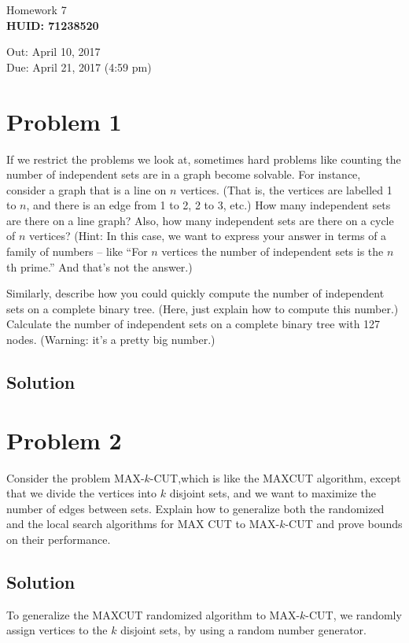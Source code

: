 \documentclass[11pt]{article}
\begin{document}
\begin{center} Homework 7 \\
\textbf{HUID: 71238520}
\end{center}
\begin{flushright}
Out: April 10, 2017\\
Due: April 21, 2017 (4:59 pm)
\end{flushright}

\section{Problem 1}
If we restrict the problems we look at, sometimes hard problems like counting the number of independent sets are in a graph become solvable. For instance, consider a graph that is a line on $n$ vertices. (That is, the vertices are labelled 1 to $n$, and there is an edge from 1 to 2, 2 to 3, etc.) How many independent sets are there on a line graph? Also, how many independent sets are there on a cycle of $n$ vertices? (Hint: In this case, we want to express your answer in terms of a family of numbers – like “For $n$ vertices the number of independent sets is the $n$th prime.” And that’s not the answer.)

Similarly, describe how you could quickly compute the number of independent sets on a complete binary tree. (Here, just explain how to compute this number.) Calculate the number of independent sets on a complete binary tree with 127 nodes. (Warning: it’s a pretty big number.)
\subsection{Solution}

\section{Problem 2}
Consider the problem MAX-$k$-CUT,which is like the MAXCUT algorithm, except that we divide the vertices into $k$ disjoint sets, and we want to maximize the number of edges between sets. Explain how to generalize both the randomized and the local search algorithms for MAX CUT to MAX-$k$-CUT and prove bounds on their performance.
\subsection{Solution}
To generalize the MAXCUT randomized algorithm to MAX-$k$-CUT, we randomly assign vertices to the $k$ disjoint sets, by using a random number generator. 
\end{document}
